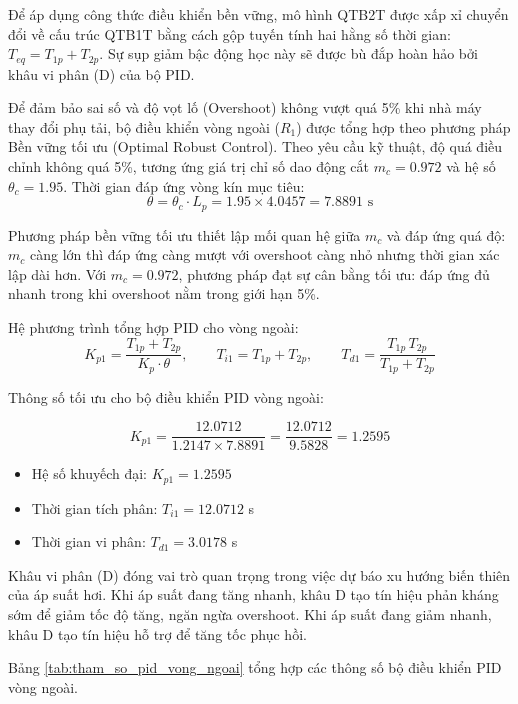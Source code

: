\documentclass[../main.tex]{subfiles}
\begin{document}
Để áp dụng công thức điều khiển bền vững, mô hình QTB2T được xấp xỉ chuyển đổi về cấu trúc QTB1T bằng cách gộp tuyến tính hai hằng số thời gian: $T_{eq} = T_{1p} + T_{2p}$. Sự sụp giảm bậc động học này sẽ được bù đắp hoàn hảo bởi khâu vi phân (D) của bộ PID.

Để đảm bảo sai số và độ vọt lố (Overshoot) không vượt quá 5\% khi nhà máy thay đổi phụ tải, bộ điều khiển vòng ngoài ($R_1$) được tổng hợp theo phương pháp Bền vững tối ưu (Optimal Robust Control). Theo yêu cầu kỹ thuật, độ quá điều chỉnh không quá 5\%, tương ứng giá trị chỉ số dao động cắt $m_c = 0.972$ và hệ số $\theta_c = 1.95$. Thời gian đáp ứng vòng kín mục tiêu:
\begin{equation}
    \theta = \theta_c \cdot L_p = 1.95 \times 4.0457 = 7.8891 \text{ s}
    \label{eq:target_response}
\end{equation}

Phương pháp bền vững tối ưu thiết lập mối quan hệ giữa $m_c$ và đáp ứng quá độ: $m_c$ càng lớn thì đáp ứng càng mượt với overshoot càng nhỏ nhưng thời gian xác lập dài hơn. Với $m_c = 0.972$, phương pháp đạt sự cân bằng tối ưu: đáp ứng đủ nhanh trong khi overshoot nằm trong giới hạn 5\%.

Hệ phương trình tổng hợp PID cho vòng ngoài:
\begin{equation}
    K_{p1} = \frac{T_{1p} + T_{2p}}{K_p \cdot \theta}, \qquad
    T_{i1} = T_{1p} + T_{2p}, \qquad
    T_{d1} = \frac{T_{1p}\, T_{2p}}{T_{1p} + T_{2p}}
    \label{eq:pid_parameters}
\end{equation}

Thông số tối ưu cho bộ điều khiển PID vòng ngoài:

\[
K_{p1} = \frac{12.0712}{1.2147 \times 7.8891} = \frac{12.0712}{9.5828} = 1.2595
\]

\begin{itemize}
    \item Hệ số khuyếch đại: $K_{p1} = 1.2595$
    \item Thời gian tích phân: $T_{i1} = 12.0712$ s
    \item Thời gian vi phân: $T_{d1} = 3.0178$ s
\end{itemize}

Khâu vi phân (D) đóng vai trò quan trọng trong việc dự báo xu hướng biến thiên của áp suất hơi. Khi áp suất đang tăng nhanh, khâu D tạo tín hiệu phản kháng sớm để giảm tốc độ tăng, ngăn ngừa overshoot. Khi áp suất đang giảm nhanh, khâu D tạo tín hiệu hỗ trợ để tăng tốc phục hồi.

Bảng \ref{tab:tham_so_pid_vong_ngoai} tổng hợp các thông số bộ điều khiển PID vòng ngoài.
\end{document}
